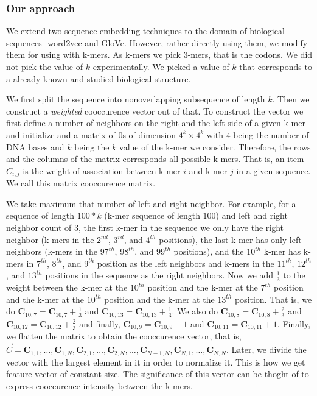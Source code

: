 \documentclass[oneside, twocolumn, a4paper, 10pt]{IEEEtran}
\begin{document}
\subsubsection{Our approach}
We extend two sequence embedding techniques to the domain of biological sequences- word2vec and GloVe. However, rather directly using them, we modify them for using with k-mers. As k-mers we pick 3-mers, that is the codons. We did not pick the value of $k$ experimentally. We picked a value of $k$ that corresponds to a already known and studied biological structure.\\
\par
We first split the sequence into nonoverlapping subsequence of length $k$. Then we construct a \textit{weighted} cooccurence vector out of that. To construct the vector we first define a number of neighbors on the right and the left side of a given k-mer and initialize and a matrix of $0$s of dimension $4^k \times 4^k$ with $4$ being the number of DNA bases and $k$ being the $k$ value of the k-mer we consider. Therefore, the rows and the columns of the matrix corresponds all possible k-mers. That is, an item $C_{i,j}$ is the weight of association between k-mer $i$ and k-mer $j$ in a given sequence. We call this matrix cooccurence matrix.\\
\par
We take maximum that number of left and right neighbor. For example, for a sequence of length $100 * k$ (k-mer sequence of length $100$) and left and right neighbor count of $3$, the first k-mer in the sequence we only have the right neighbor (k-mers in the $2^{nd}$, $3^{rd}$, and $4^{th}$ positions), the last k-mer has only left neighbors (k-mers in the $97^{th}$, $98^{th}$, and $99^{th}$ positions), and the $10^{th}$ k-mer has k-mers in $7^{th}$, $8^{th}$, and $9^{th}$ position as the left neighbors and k-mers in the $11^{th}$, $12^{th}$, and $13^{th}$ positions in the sequence as the right neighbors. Now we add $\frac{1}{3}$ to the weight between the k-mer at the $10^{th}$ position and the k-mer at the $7^{th}$ position and the k-mer at the $10^{th}$ position and the k-mer at the $13^{th}$ position. That is, we do $\mathbf{C}_{10, 7} = \mathbf{C}_{10, 7} + \frac{1}{3}$ and $\mathbf{C}_{10, 13} = \mathbf{C}_{10, 13} + \frac{1}{3}$. We also do $\mathbf{C}_{10, 8} = \mathbf{C}_{10, 8} + \frac{2}{3}$ and $\mathbf{C}_{10, 12} = \mathbf{C}_{10, 12} + \frac{2}{3}$ and finally, $\mathbf{C}_{10, 9} = \mathbf{C}_{10, 9} + 1$ and $\mathbf{C}_{10, 11} = \mathbf{C}_{10, 11} + 1$. Finally, we flatten the matrix to obtain the cooccurence vector, that is, $\vec{C} = \mathbf{C}_{1,1}, \ldots, \mathbf{C}_{1, N}, \mathbf{C}_{2, 1}, \ldots, \mathbf{C}_{2, N}, \ldots, \mathbf{C}_{N-1, N},\mathbf{C}_{N, 1}, \ldots, \mathbf{C}_{N, N}$. Later, we divide the vector with the largest element in it in order to normalize it. This is how we get feature vector of constant size. The significance of this vector can be thoght of to express cooccurence intensity between the k-mers.
\end{document}
